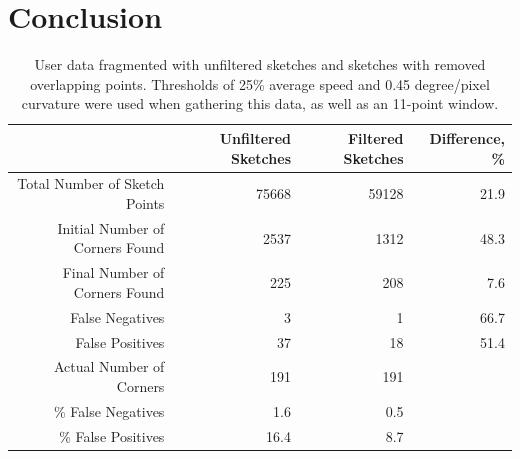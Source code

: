 \documentclass[10pt]{acmsiggraph}          %
\begin{document}


\section{Conclusion}








%

\clearpage

\begin{table}[p]
   \centering
   \begin{tabular}{||r||r|r|r||}
	    \hline
	    & Unfiltered Sketches & Filtered Sketches & Difference, \% \\
	    \hline 
	    Total Number of Sketch Points & 75668 & 59128 & 21.9 \\
	    \hline
	    Initial Number of Corners Found & 2537 & 1312 & 48.3 \\
	    \hline
	    Final Number of Corners Found & 225 & 208 & 7.6 \\
	    \hline 
	    False Negatives & 3 & 1 & 66.7 \\
	    \hline
	    False Positives & 37 & 18 & 51.4 \\
	    \hline
	    \hline
	    Actual Number of Corners & 191 & 191 & \\
	    \hline
	    \% False Negatives & 1.6 & 0.5 & \\
	    \hline
	    \% False Positives & 16.4 & 8.7 & \\
	    \hline
	  \end{tabular}
	  \caption{User data fragmented with unfiltered sketches and sketches with removed overlapping points. Thresholds of 25\% average speed and 0.45 degree/pixel
	  curvature were used when gathering this data, as well as an 11-point window.}
	  \label{table:filter_table}
\end{table}
\end{document}
